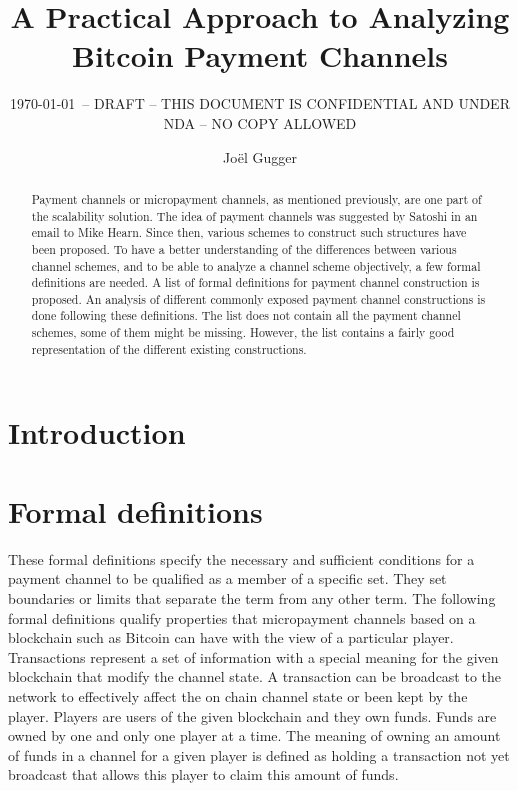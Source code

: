 \documentclass{llncs}
\begin{document}
\title{A Practical Approach to Analyzing Bitcoin Payment Channels}
\author{Jo\"el Gugger}


\subtitle{{\normalsize\today{\small\ -- DRAFT -- THIS DOCUMENT IS CONFIDENTIAL AND UNDER NDA -- NO COPY ALLOWED}}}


\maketitle

\begin{abstract} Payment channels or micropayment channels, as mentioned previously, are one part of the scalability solution. The idea of payment channels was suggested by Satoshi in an email to Mike Hearn. Since then, various schemes to construct such structures have been proposed. To have a better understanding of the differences between various channel schemes, and to be able to analyze a channel scheme objectively, a few formal definitions are needed. A list of formal definitions for payment channel construction is proposed. An analysis of different commonly exposed payment channel constructions is done following these definitions. The list does not contain all the payment channel schemes, some of them might be missing. However, the list contains a fairly good representation of the different existing constructions.
\end{abstract}

\section{Introduction}

\section{Formal definitions}

These formal definitions specify the necessary and sufficient conditions for a payment channel to be qualified as a member of a specific set. They set boundaries or limits that separate the term from any other term. The following formal definitions qualify properties that micropayment channels based on a blockchain such as Bitcoin can have with the view of a particular player.  Transactions represent a set of information with a special meaning for the given blockchain that modify the channel state. A transaction can be broadcast to the network to effectively affect the on chain channel state or been kept by the player. Players are users of the given blockchain and they own funds. Funds are owned by one and only one player at a time. The meaning of owning an amount of funds in a channel for a given player is defined as holding a transaction not yet broadcast that allows this player to claim this amount of funds.
\end{document}
